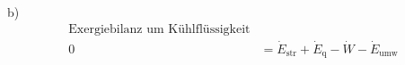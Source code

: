 b) 
\begin{align*}
\text{Exergiebilanz um Kühlflüssigkeit} \\
0 &= \dot{E}_{\text{str}} + \dot{E}_{\text{q}} - \dot{W} - \dot{E}_{\text{umw}}
\end{align*}